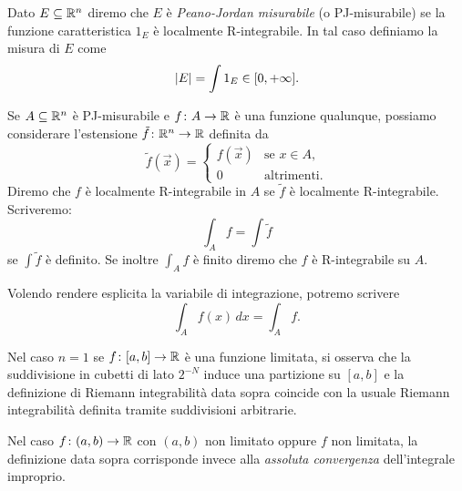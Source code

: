 \begin{definition}
Dato $E\subseteq {\mathbb R}^n$ diremo che $E$ è \emph{Peano-Jordan misurabile} 
(o PJ-misurabile) se la funzione caratteristica $1_E$ è localmente 
R-integrabile. In tal caso definiamo la misura di $E$ come 
\[
{\left|E\right|} = \int 1_E \in [0,+\infty].
\] 

Se $A\subseteq {\mathbb R}^n$ è PJ-misurabile e $f\colon A \to {\mathbb R}$
è una funzione qualunque, possiamo considerare l'estensione 
$\tilde f\colon {\mathbb R}^n \to {\mathbb R}$ definita da 
\[
 \tilde f(\vec x) = \begin{cases}
    f(\vec x) & \text{se $x\in A$,}\\
    0 & \text{altrimenti.}
 \end{cases}
\]
Diremo che $f$ è localmente R-integrabile in $A$ se $\tilde f$ 
è localmente R-integrabile. 
Scriveremo:
\[
 \int_A f = \int \tilde f
\]
se $\int \tilde f$ è definito.
Se inoltre $\int_A f$ è finito diremo che $f$ è R-integrabile
su $A$.

Volendo rendere esplicita la variabile di integrazione, potremo 
scrivere 
\[
  \int_A f(x)\, dx = \int_A f.
\]
\end{definition}

\begin{remark}[caso $n=1$]
Nel caso $n=1$ se $f\colon [a,b]\to {\mathbb R}$ è una funzione limitata,
si osserva che la suddivisione in cubetti di lato $2^{-N}$ induce una partizione 
su $[a,b]$ e la definizione di Riemann integrabilità data sopra coincide con la 
usuale Riemann integrabilità definita tramite suddivisioni arbitrarie.

Nel caso $f\colon(a,b)\to {\mathbb R}$ con $(a,b)$ non limitato oppure $f$ non limitata,
la definizione data sopra corrisponde invece alla \emph{assoluta convergenza} 
dell'integrale improprio.
\end{remark}

